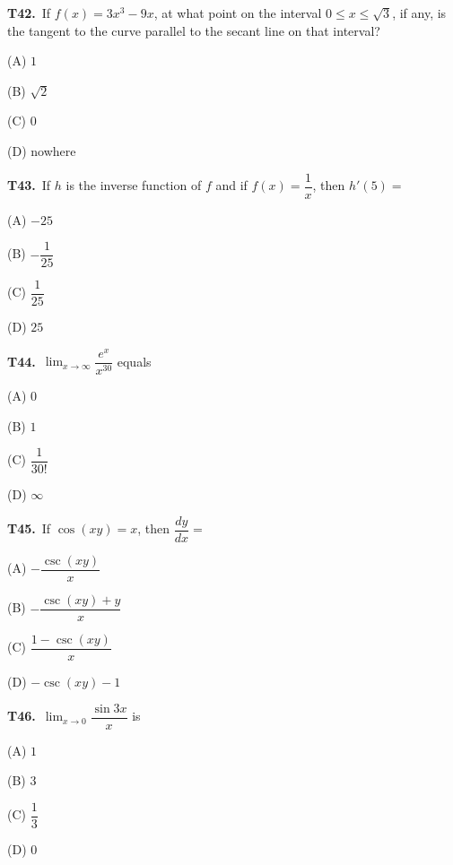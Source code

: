 \documentclass[11pt]{article}
\begin{document}
\bigskip\noindent\textbf{T42.}\ If $f(x) = 3x^3-9x$, at what point on the interval $0 \leq x \leq \sqrt{3}$, if any, is the tangent to the curve parallel to the secant line on that interval?
\begin{list}{}{\setlength{\leftmargin}{3em}\setlength{\labelwidth}{2.5em}\setlength{\itemsep}{0pt}\setlength{\topsep}{2pt}}
\item[(A)] $1$
\item[(B)] $\sqrt{2}$
\item[(C)] $0$
\item[(D)] nowhere
\end{list}

\bigskip\noindent\textbf{T43.}\ If $h$ is the inverse function of $f$ and if $f(x) = \dfrac{1}{x}$, then $h'(5) =$
\begin{list}{}{\setlength{\leftmargin}{3em}\setlength{\labelwidth}{2.5em}\setlength{\itemsep}{0pt}\setlength{\topsep}{2pt}}
\item[(A)] $-25$
\item[(B)] $-\dfrac{1}{25}$
\item[(C)] $\dfrac{1}{25}$
\item[(D)] $25$
\end{list}

\bigskip\noindent\textbf{T44.}\ $\displaystyle\lim_{x\to\infty}\dfrac{e^x}{x^{30}}$ equals
\begin{list}{}{\setlength{\leftmargin}{3em}\setlength{\labelwidth}{2.5em}\setlength{\itemsep}{0pt}\setlength{\topsep}{2pt}}
\item[(A)] $0$
\item[(B)] $1$
\item[(C)] $\dfrac{1}{30!}$
\item[(D)] $\infty$
\end{list}

\bigskip\noindent\textbf{T45.}\ If $\cos(xy) = x$, then $\dfrac{dy}{dx} =$
\begin{list}{}{\setlength{\leftmargin}{3em}\setlength{\labelwidth}{2.5em}\setlength{\itemsep}{0pt}\setlength{\topsep}{2pt}}
\item[(A)] $-\dfrac{\csc(xy)}{x}$
\item[(B)] $-\dfrac{\csc(xy)+y}{x}$
\item[(C)] $\dfrac{1-\csc(xy)}{x}$
\item[(D)] $-\csc(xy) - 1$
\end{list}

\bigskip\noindent\textbf{T46.}\ $\displaystyle\lim_{x\to 0}\dfrac{\sin 3x}{x}$ is
\begin{list}{}{\setlength{\leftmargin}{3em}\setlength{\labelwidth}{2.5em}\setlength{\itemsep}{0pt}\setlength{\topsep}{2pt}}
\item[(A)] $1$
\item[(B)] $3$
\item[(C)] $\dfrac{1}{3}$
\item[(D)] $0$
\end{list}
\end{document}
